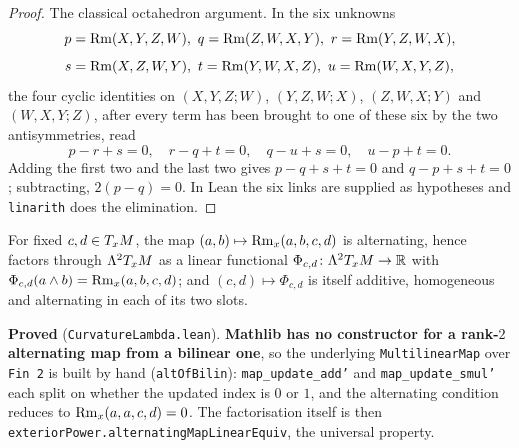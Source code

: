 \begin{proof}
  \leanok
  The classical octahedron argument. In the six unknowns
  \[
    p = \operatorname{Rm}(X,Y,Z,W),\ q = \operatorname{Rm}(Z,W,X,Y),\ r = \operatorname{Rm}(Y,Z,W,X),
  \]
  \[
    s = \operatorname{Rm}(X,Z,W,Y),\ t = \operatorname{Rm}(Y,W,X,Z),\ u = \operatorname{Rm}(W,X,Y,Z),
  \]
  the four cyclic identities on $(X,Y,Z;W)$, $(Y,Z,W;X)$, $(Z,W,X;Y)$ and
  $(W,X,Y;Z)$, after every term has been brought to one of these six by the two
  antisymmetries, read
  \[
    p - r + s = 0,\quad r - q + t = 0,\quad q - u + s = 0,\quad u - p + t = 0 .
  \]
  Adding the first two and the last two gives $p - q + s + t = 0$ and
  $q - p + s + t = 0$; subtracting, $2(p-q) = 0$. In Lean the six links are
  supplied as hypotheses and \texttt{linarith} does the elimination.
\end{proof}

\begin{lemma}
  \label{lem:curvature-lambda-fst}
  \leanok
  For fixed $c,d \in T_xM$, the map $(a,b) \mapsto \operatorname{Rm}_x(a,b,c,d)$ is alternating,
  hence factors through $\Lambda^2 T_xM$ as a linear functional
  $\Phi_{c,d} \colon \Lambda^2 T_xM \to \mathbb{R}$ with
  $\Phi_{c,d}(a \wedge b) = \operatorname{Rm}_x(a,b,c,d)$; and $(c,d) \mapsto \Phi_{c,d}$ is
  itself additive, homogeneous and alternating in each of its two slots.

  \textbf{Proved} (\texttt{CurvatureLambda.lean}). \textbf{Mathlib has no constructor
  for a rank-$2$ alternating map from a bilinear one}, so the underlying
  \texttt{MultilinearMap} over \texttt{Fin 2} is built by hand
  (\texttt{altOfBilin}): \texttt{map\_update\_add'} and \texttt{map\_update\_smul'}
  each split on whether the updated index is $0$ or $1$, and the alternating
  condition reduces to $\operatorname{Rm}_x(a,a,c,d) = 0$. The factorisation itself is then
  \texttt{exteriorPower.alternatingMapLinearEquiv}, the universal property.


\end{lemma}
